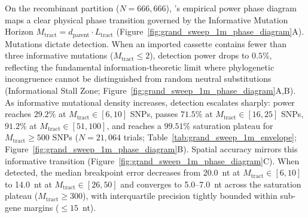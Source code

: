 On the recombinant partition ($N = 666{,}666$), \RhizAeon's empirical power phase diagram maps a clear physical phase transition governed by the Informative Mutation Horizon $M_{\mathrm{tract}} = d_{\mathrm{parent}} \cdot L_{\mathrm{tract}}$ (Figure~\ref{fig:grand_sweep_1m_phase_diagram}A).
Mutations dictate detection.
When an imported cassette contains fewer than three informative mutations ($M_{\mathrm{tract}} \le 2$), detection power drops to $0.5\%$, reflecting the fundamental information-theoretic limit where phylogenetic incongruence cannot be distinguished from random neutral substitutions (Informational Stall Zone; Figure~\ref{fig:grand_sweep_1m_phase_diagram}A,B).
As informative mutational density increases, detection escalates sharply: power reaches $29.2\%$ at $M_{\mathrm{tract}} \in [6, 10]$ SNPs, passes $71.5\%$ at $M_{\mathrm{tract}} \in [16, 25]$ SNPs, $91.2\%$ at $M_{\mathrm{tract}} \in [51, 100]$, and reaches a $99.51\%$ saturation plateau for $M_{\mathrm{tract}} \ge 500$ SNPs ($N = 21{,}064$ trials; Table~\ref{tab:grand_sweep_1m_envelope}; Figure~\ref{fig:grand_sweep_1m_phase_diagram}B).
Spatial accuracy mirrors this informative transition (Figure~\ref{fig:grand_sweep_1m_phase_diagram}C).
When detected, the median breakpoint error decreases from 20.0~nt at $M_{\mathrm{tract}} \in [6, 10]$ to 14.0~nt at $M_{\mathrm{tract}} \in [26, 50]$ and converges to 5.0--7.0~nt across the saturation plateau ($M_{\mathrm{tract}} \ge 300$), with interquartile precision tightly bounded within sub-gene margins ($\le 15$~nt).

